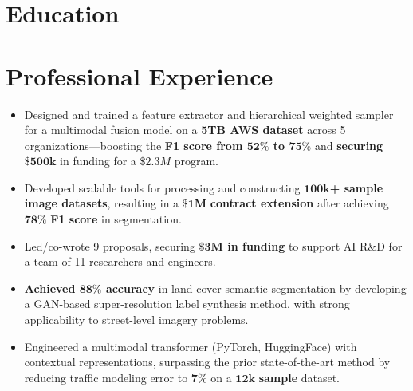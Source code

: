 \documentclass[11pt,a4paper,sans]{moderncv} %
\begin{document}
\makecvtitle %
\vspace*{-1.5cm}


\section{Education}


\section{Professional Experience}
{
\begin{itemize}
	\item Designed and trained a feature extractor and hierarchical weighted sampler for a multimodal fusion model on a \textbf{5TB AWS dataset} across 5 organizations—boosting the \textbf{F1 score from $\mathbf{52\%}$ to $\mathbf{75\%}$} and \textbf{securing} $\mathbf{\$500k}$ in funding for a $\$2.3M$ program.
	\item Developed scalable tools for processing and constructing $\mathbf{100k}$\textbf{+ sample image datasets}, resulting in a $\mathbf{\$1M}$ \textbf{contract extension} after achieving $\mathbf{78\%}$ \textbf{F1 score} in segmentation.
	\item Led/co-wrote 9 proposals, securing \textbf{$\mathbf{\$3M}$ in funding} to support AI R\&D for a team of 11 researchers and engineers.
	\item \textbf{Achieved $\mathbf{88\%}$ accuracy} in land cover semantic segmentation by developing a GAN-based super-resolution label synthesis method, with strong applicability to street-level imagery problems.
	\item Engineered a multimodal transformer (PyTorch, HuggingFace) with contextual representations, surpassing the prior state-of-the-art method by reducing traffic modeling error to $\mathbf{7\%}$ on a $\mathbf{12k}$ \textbf{sample} dataset.
\end{itemize}
}
\end{document}
